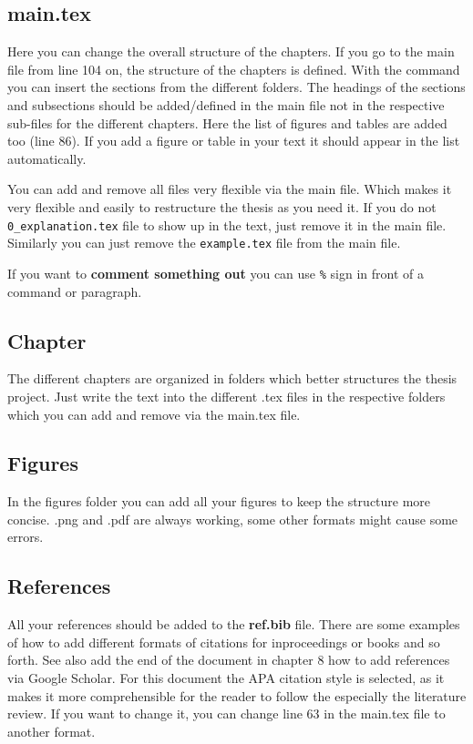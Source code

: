 \subsection{main.tex}
Here you can change the overall structure of the chapters. If you go to the main file from line 104 on, the structure of the chapters is defined. With the \verb!! command you can insert the sections from the different folders. The headings of the sections and subsections should be added/defined in the main file not in the respective sub-files for the different chapters. Here the list of figures and tables are added too (line 86). If you add a figure or table in your text it should appear in the list automatically. 

You can add and remove all files very flexible via the main file. Which makes it very flexible and easily to restructure the thesis as you need it. If you do not \verb!0_explanation.tex! file to show up in the text, just remove it in the main file. Similarly you can just remove the  \verb!example.tex! file from the main file. 

If you want to \textbf{comment something out} you can use \verb!%! sign in front of a command or paragraph. 


\subsection{Chapter}
The different chapters are organized in folders which better structures the thesis project. Just write the text into the different .tex files in the respective folders which you can add and remove via the main.tex file. 

\subsection{Figures}
In the figures folder you can add all your figures to keep the structure more concise. .png and .pdf are always working, some other formats might cause some errors. 

\subsection{References}
All your references should be added to the \textbf{ref.bib} file. There are some examples of how to add different formats of citations for inproceedings or books and so forth. See also add the end of the document in chapter 8 how to add references via Google Scholar. For this document the APA citation style is selected, as it makes it more comprehensible for the reader to follow the especially the literature review. If you want to change it, you can change line 63 in the main.tex file to another format.


